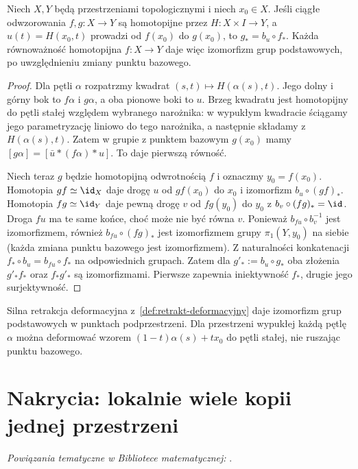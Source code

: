 \begin{wniosek}
\label{cor:pi1-homotopia}
Niech $X,Y$ będą przestrzeniami topologicznymi
i niech $x_0\in X$. Jeśli ciągłe odwzorowania
$f,g:X\to Y$ są homotopijne przez $H:X\times I\to Y$,
a $u(t)=H(x_0,t)$ prowadzi od
$f(x_0)$ do $g(x_0)$, to
$g_*=b_u\circ f_*$. Każda równoważność
homotopijna $f:X\to Y$ daje więc
izomorfizm grup podstawowych,
po uwzględnieniu zmiany punktu bazowego.
\end{wniosek}
\begin{proof}
Dla pętli $\alpha$ rozpatrzmy kwadrat
$(s,t)\mapsto H(\alpha(s),t)$.
Jego dolny i górny bok to $f\alpha$
i $g\alpha$, a oba pionowe boki to
$u$. Brzeg kwadratu jest homotopijny do pętli stałej względem
wybranego narożnika: w wypukłym kwadracie ściągamy jego parametryzację
liniowo do tego narożnika, a następnie składamy z $H(\alpha(s),t)$.
Zatem w grupie z punktem
bazowym $g(x_0)$ mamy
$[g\alpha]=[\bar u*(f\alpha)*u]$.
To daje pierwszą równość.

Niech teraz $g$ będzie homotopijną
odwrotnością $f$ i oznaczmy
$y_0=f(x_0)$. Homotopia
$gf\simeq\id_X$ daje drogę $u$
od $gf(x_0)$ do $x_0$ i
izomorfizm $b_u\circ(gf)_*$.
Homotopia $fg\simeq\id_Y$ daje pewną drogę $v$
od $fg(y_0)$ do $y_0$ z $b_v\circ(fg)_*=\id$.
Droga $fu$ ma te same końce, choć może nie być równa $v$.
Ponieważ $b_{fu}\circ b_v^{-1}$ jest izomorfizmem,
również $b_{fu}\circ(fg)_*$ jest izomorfizmem grupy
$\pi_1(Y,y_0)$ na siebie
(każda zmiana punktu bazowego
jest izomorfizmem).
Z naturalności konkatenacji
$f_*\circ b_u=b_{f u}\circ f_*$
na odpowiednich grupach.
Zatem dla $g'_*:=b_u\circ g_*$
oba złożenia $g'_*f_*$
oraz $f_*g'_*$ są izomorfizmami.
Pierwsze zapewnia iniektywność
$f_*$, drugie jego surjektywność.
\end{proof}

Silna retrakcja deformacyjna
z~\ref{def:retrakt-deformacyjny} daje
izomorfizm grup podstawowych w punktach
podprzestrzeni. Dla przestrzeni wypukłej
każdą pętlę $\alpha$ można deformować
wzorem $(1-t)\alpha(s)+tx_0$ do pętli
stałej, nie ruszając punktu bazowego.

\section{Nakrycia: lokalnie wiele kopii jednej przestrzeni}
\label{sec:nakrycia}

\noindent\emph{Powiązania tematyczne w Bibliotece matematycznej:} .


